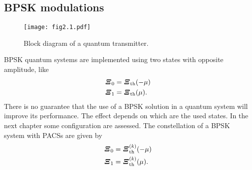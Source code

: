     \subsection{BPSK modulations}
        \begin{figure}[t]
            \texttt{[image: fig2.1.pdf]}
            \caption{Block diagram of a quantum transmitter.}
            \label{fig:2.1}
        \end{figure}
        BPSK quantum systems are implemented using two states with opposite amplitude, like
        \begin{equation}\begin{split}
            \Operator{\varXi}_0 &= \Operator{\varXi}_{\mathrm{th}}(-\mu)\\
            \Operator{\varXi}_1 &= \Operator{\varXi}_{\mathrm{th}}(\mu).
            \label{eq:2.1.2}
        \end{split}\end{equation}
        There is no guarantee that the use of a BPSK solution in  a quantum system will 
        improve its performance. The effect depends on which are the used states. In the next chapter some 
        configuration are assessed. The constellation of a BPSK system with PACSs are given by
        \begin{equation}\begin{split}
            \Operator{\varXi}_0 &= \Operator{\varXi}_{\mathrm{th}}^{(k)}(-\mu)\\
            \Operator{\varXi}_1 &= \Operator{\varXi}_{\mathrm{th}}^{(k)}(\mu).
            \label{eq:2.1.25}
        \end{split}\end{equation}
